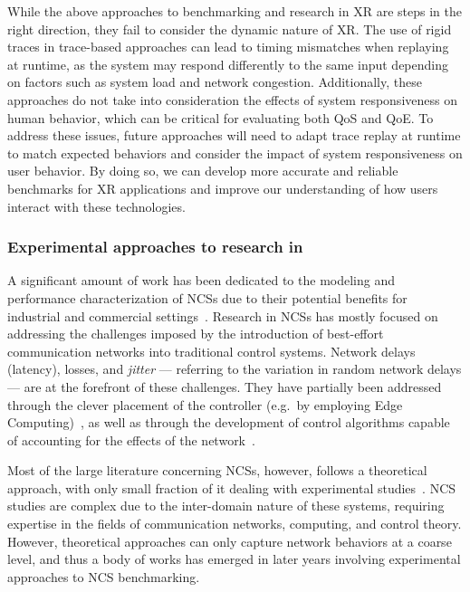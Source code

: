 While the above approaches to benchmarking and research in \gls{XR} are steps in the right direction, they fail to consider the dynamic nature of \gls{XR}.
The use of rigid traces in trace-based approaches can lead to timing mismatches when replaying at runtime, as the system may respond differently to the same input depending on factors such as system load and network congestion.
Additionally, these approaches do not take into consideration the effects of system responsiveness on human behavior, which can be critical for evaluating both \gls{QoS} and \gls{QoE}.
To address these issues, future approaches will need to adapt trace replay at runtime to match expected behaviors and consider the impact of system responsiveness on user behavior.
By doing so, we can develop more accurate and reliable benchmarks for \gls{XR} applications and improve our understanding of how users interact with these technologies.

\subsubsection{Experimental approaches to research in }

A significant amount of work has been dedicated to the modeling and performance characterization of \glspl{NCS} due to their potential benefits for industrial and commercial settings~\cite{lu2016real,hespanha2007survey,zhang2013network,zhang2016survey}.
Research in \glspl{NCS} has mostly focused on addressing the challenges imposed by the introduction of best-effort communication networks into traditional control systems.
Network delays (latency), losses, and \emph{jitter} --- referring to the variation in random network delays --- are at the forefront of these challenges.
They have partially been addressed through the clever placement of the controller (e.g.\ by employing Edge Computing)~\cite{sasaki2017layered,sasaki2016vehicle}, as well as through the development of control algorithms capable of accounting for the effects of the network~\cite{zhang2013network}.

Most of the large literature concerning \glspl{NCS}, however, follows a theoretical approach, with only small fraction of it dealing with experimental studies~\cite{zhang2019networked}.
\gls{NCS} studies are complex due to the inter-domain nature of these systems, requiring expertise in the fields of communication networks, computing, and control theory.
However, theoretical approaches can only capture network behaviors at a coarse level, and thus a body of works has emerged in later years involving experimental approaches to \gls{NCS} benchmarking.

